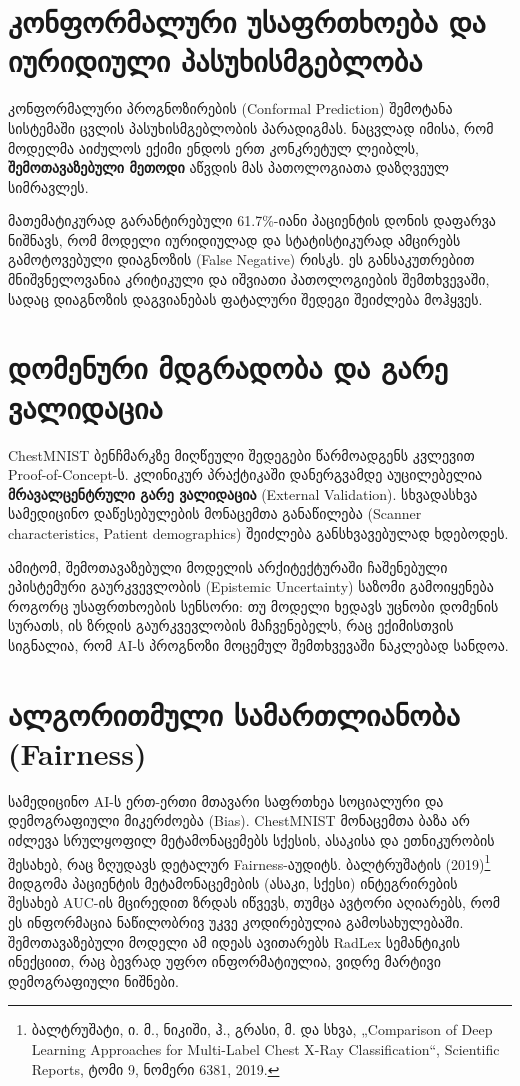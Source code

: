 \documentclass[12pt,a4paper,oneside]{report}
\begin{document}
\section{კონფორმალური უსაფრთხოება და იურიდიული პასუხისმგებლობა}
კონფორმალური პროგნოზირების (Conformal Prediction) შემოტანა სისტემაში ცვლის პასუხისმგებლობის პარადიგმას. ნაცვლად იმისა, რომ მოდელმა აიძულოს ექიმი ენდოს ერთ კონკრეტულ ლეიბლს, \textbf{შემოთავაზებული მეთოდი} აწვდის მას პათოლოგიათა დაზღვეულ სიმრავლეს. 

მათემატიკურად გარანტირებული 61.7\%-იანი პაციენტის დონის დაფარვა ნიშნავს, რომ მოდელი იურიდიულად და სტატისტიკურად ამცირებს გამოტოვებული დიაგნოზის (False Negative) რისკს. ეს განსაკუთრებით მნიშვნელოვანია კრიტიკული და იშვიათი პათოლოგიების შემთხვევაში, სადაც დიაგნოზის დაგვიანებას ფატალური შედეგი შეიძლება მოჰყვეს.

\section{დომენური მდგრადობა და გარე ვალიდაცია}
ChestMNIST ბენჩმარკზე მიღწეული შედეგები წარმოადგენს კვლევით Proof-of-Concept-ს. კლინიკურ პრაქტიკაში დანერგვამდე აუცილებელია \textbf{მრავალცენტრული გარე ვალიდაცია} (External Validation). სხვადასხვა სამედიცინო დაწესებულების მონაცემთა განაწილება (Scanner characteristics, Patient demographics) შეიძლება განსხვავებულად ხდებოდეს. 

ამიტომ, შემოთავაზებული მოდელის არქიტექტურაში ჩაშენებული ეპისტემური გაურკვევლობის (Epistemic Uncertainty) საზომი გამოიყენება როგორც უსაფრთხოების სენსორი: თუ მოდელი ხედავს უცნობი დომენის სურათს, ის ზრდის გაურკვევლობის მაჩვენებელს, რაც ექიმისთვის სიგნალია, რომ AI-ს პროგნოზი მოცემულ შემთხვევაში ნაკლებად სანდოა.

\section{ალგორითმული სამართლიანობა (Fairness)}
სამედიცინო AI-ს ერთ-ერთი მთავარი საფრთხეა სოციალური და დემოგრაფიული მიკერძოება (Bias). ChestMNIST მონაცემთა ბაზა არ იძლევა სრულყოფილ მეტამონაცემებს სქესის, ასაკისა და ეთნიკურობის შესახებ, რაც ზღუდავს დეტალურ Fairness-აუდიტს. ბალტრუშატის (2019)\footnote{ბალტრუშატი, ი. მ., ნიკიში, ჰ., გრასი, მ. და სხვა, „Comparison of Deep Learning Approaches for Multi-Label Chest X-Ray Classification“, Scientific Reports, ტომი 9, ნომერი 6381, 2019.} მიდგომა პაციენტის მეტამონაცემების (ასაკი, სქესი) ინტეგრირების შესახებ AUC-ის მცირედით ზრდას იწვევს, თუმცა ავტორი აღიარებს, რომ ეს ინფორმაცია ნაწილობრივ უკვე კოდირებულია გამოსახულებაში. შემოთავაზებული მოდელი ამ იდეას ავითარებს RadLex სემანტიკის ინექციით, რაც ბევრად უფრო ინფორმატიულია, ვიდრე მარტივი დემოგრაფიული ნიშნები.
\end{document}
